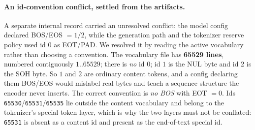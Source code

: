 \documentclass[11pt]{article}
\begin{document}
\paragraph{An id-convention conflict, settled from the artifacts.} A separate internal
record carried an unresolved conflict: the model config declared BOS/EOS $=1/2$, while
the generation path and the tokenizer reserve policy used id $0$ as EOT/PAD. We resolved
it by reading the active vocabulary rather than choosing a convention. The vocabulary
file has \textbf{65529 lines}, numbered contiguously $1..65529$; there is \emph{no} id
$0$; id $1$ is the NUL byte and id $2$ is the SOH byte. So $1$ and $2$ are ordinary
content tokens, and a config declaring them BOS/EOS would mislabel real bytes and teach
a sequence structure the encoder never inserts. The correct convention is \emph{no BOS}
with EOT $=0$. Ids \texttt{65530}/\texttt{65531}/\texttt{65535} lie outside the content
vocabulary and belong to the tokenizer's special-token layer, which is why the two
layers must not be conflated: \texttt{65531} is absent as a content id and present as
the end-of-text special id.
\end{document}
